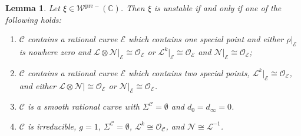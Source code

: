 \documentclass{amsart}
\newtheorem{lem}[thm]{Lemma}
\theoremstyle{definition}
\theoremstyle{remark}
\theoremstyle{plain}
\theoremstyle{definition}
\theoremstyle{remark}
\newcommand{\C}{\mathbb{C}}
\newcommand{\mc}[1]{\mathcal{#1}}
\newcommand{\mr}[1]{\mathrm{#1}}
\newcommand{\1}{\mathbf{1}}
\newcommand{\2}{\mathbf{2}}
\newcommand{\3}{\mathbf{3}}
\newcommand{\pre}{\mr{pre}}
\begin{document}
\begin{lem}\label{lem:stabilitydegeneracy}
  Let $\xi \in \mc{W}^{\pre -}(\C)$. Then $\xi$ is unstable if and only if one of the following holds:
  \begin{enumerate}
  \item $\mc{C}$ contains a rational curve $\mc{E}$ which contains one special point and either $\rho|_{\mc{E}}$ is nowhere zero and $\mc{L} \otimes \mc{N} |_{\mc{E}} \cong \mc{O}_{\mc{E}}$ or $\mc{L}^k|_{\mc{E}} \cong \mc{O}_{\mc{E}}$ and $\mc{N}|_{\mc{E}} \cong \mc{O}_{\mc{E}}$;
  \item $\mc{C}$ contains a rational curve $\mc{E}$ which contains two special points, $\mc{L}^k |_{\mc{E}} \cong \mc{O}_{\mc{E}}$, and either $\mc{L}\otimes \mc{N} | \cong \mc{O}_{\mc{E}}$ or $\mc{N} |_{\mc{E}} \cong \mc{O}_{\mc{E}}$.
  \item $\mc{C}$ is a smooth rational curve with $\Sigma^{\mc{C}} = \emptyset$ and $d_0 = d_{\infty} = 0$.
  \item $\mc{C}$ is irreducible, $g=1$, $\Sigma^{\mc{C}} = \emptyset$, $\mc{L}^k \cong \mc{O}_{\mc{C}}$, and $\mc{N} \cong \mc{L}^{-1}$.
  \end{enumerate}
\end{lem}
\end{document}
